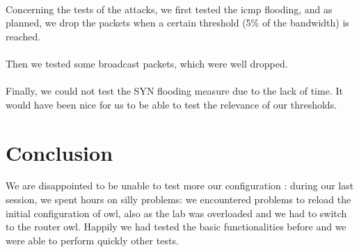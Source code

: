 \documentclass[a4paper,titlepage]{article}
\begin{document}
\paragraph{}Concerning the tests of the attacks, we first tested the icmp flooding, and as planned, we drop the packets when a certain threshold (5\% of the bandwidth) is reached. 

\paragraph{}Then we tested some broadcast packets, which were well dropped. 
\paragraph{} Finally, we could not test the SYN flooding measure due to the lack of time. It would have been nice for us to be able to test the relevance of our thresholds. 

\section{Conclusion}
We are disappointed to be unable to test more our configuration : during our last session, we spent hours on silly problems: we encountered problems to reload the initial configuration of owl, also as the lab was overloaded and we had to switch to the router owl. Happily we had tested the basic functionalities before and we were able to perform quickly other tests. 
\end{document}
